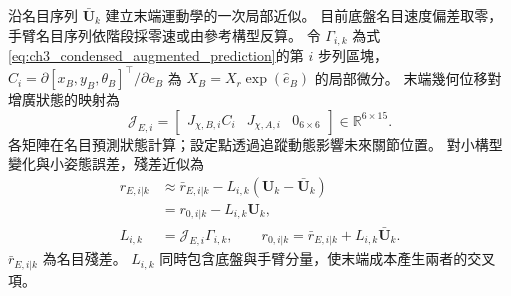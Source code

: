 沿名目序列 $\bar{\mathbf U}_k$ 建立末端運動學的一次局部近似。
目前底盤名目速度偏差取零，手臂名目序列依階段採零速或由參考構型反算。
令 $\Gamma_{i,k}$ 為式\eqref{eq:ch3_condensed_augmented_prediction}的第 $i$ 步列區塊，
$C_i=\partial[x_B,y_B,\theta_B]^\top/\partial e_B$
為 $X_B=X_r\exp(\widehat e_B)$ 的局部微分。
末端幾何位移對增廣狀態的映射為
\begin{equation}
    \mathcal J_{E,i}=
    \begin{bmatrix}
        J_{\chi,B,i}C_i&J_{\chi,A,i}&0_{6\times6}
    \end{bmatrix}\in\mathbb R^{6\times15}.
    \label{eq:ch3_tcp_augmented_geometric_jacobian}
\end{equation}
各矩陣在名目預測狀態計算；設定點透過追蹤動態影響未來關節位置。
對小構型變化與小姿態誤差，殘差近似為
\begin{equation}
    \begin{aligned}
        r_{E,i|k}
        &\approx\bar r_{E,i|k}
        -L_{i,k}(\mathbf U_k-\bar{\mathbf U}_k)\\
        &=r_{0,i|k}-L_{i,k}\mathbf U_k,\\
        L_{i,k}&=\mathcal J_{E,i}\Gamma_{i,k},\qquad
        r_{0,i|k}=\bar r_{E,i|k}+L_{i,k}\bar{\mathbf U}_k .
    \end{aligned}
    \label{eq:ch3_tcp_affine_residual}
\end{equation}
$\bar r_{E,i|k}$ 為名目殘差。
$L_{i,k}$ 同時包含底盤與手臂分量，使末端成本產生兩者的交叉項。


